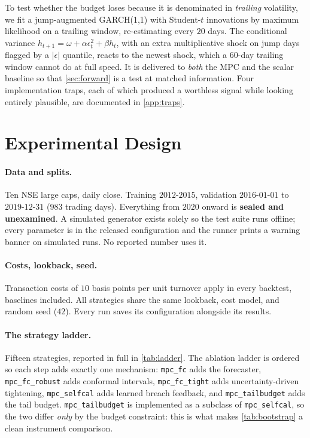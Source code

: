\documentclass[journal]{IEEEtran}
\begin{document}
To test whether the budget loses because it is denominated in \emph{trailing}
volatility, we fit a jump-augmented GARCH(1,1) with Student-$t$ innovations by
maximum likelihood on a trailing window, re-estimating every $20$ days. The
conditional variance
$h_{t+1}=\omega+\alpha\epsilon_t^2+\beta h_t$, with an extra multiplicative shock
on jump days flagged by a $|\epsilon|$ quantile, reacts to the newest shock, which
a $60$-day trailing window cannot do at full speed. It is delivered to \emph{both}
the MPC and the scalar baseline so that \cref{sec:forward} is a test at matched
information. Four implementation traps, each of which produced a worthless signal
while looking entirely plausible, are documented in \cref{app:traps}.

\section{Experimental Design}
\label{sec:design}

\paragraph{Data and splits.} Ten NSE large caps, daily close. Training
$2012$-$2015$, validation $2016$-$01$-$01$ to $2019$-$12$-$31$ ($983$ trading
days). Everything from $2020$ onward is \textbf{sealed and unexamined}. A
simulated generator exists solely so the test suite runs offline; every parameter
is in the released configuration and the runner prints a warning banner on
simulated runs. No reported number uses it.

\paragraph{Costs, lookback, seed.} Transaction costs of $10$ basis points per unit
turnover apply in every backtest, baselines included. All strategies share the
same lookback, cost model, and random seed ($42$). Every run saves its
configuration alongside its results.

\paragraph{The strategy ladder.} Fifteen strategies, reported in full in
\cref{tab:ladder}. The ablation ladder is ordered so each step adds exactly one
mechanism: \texttt{mpc\_fc} adds the forecaster, \texttt{mpc\_fc\_robust} adds
conformal intervals, \texttt{mpc\_fc\_tight} adds uncertainty-driven tightening,
\texttt{mpc\_selfcal} adds learned breach feedback, and
\texttt{mpc\_tailbudget} adds the tail budget. \texttt{mpc\_tailbudget} is
implemented as a subclass of \texttt{mpc\_selfcal}, so the two differ \emph{only}
by the budget constraint: this is what makes \cref{tab:bootstrap} a clean
instrument comparison.
\end{document}
